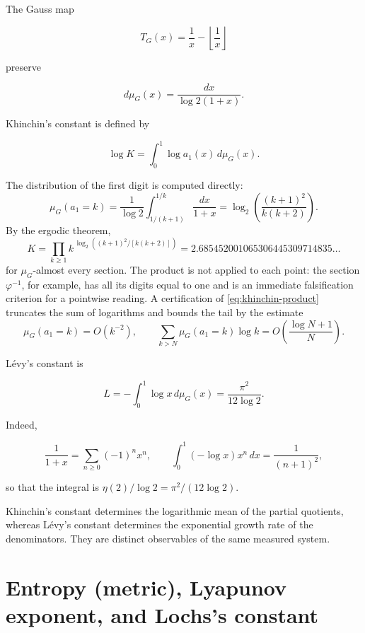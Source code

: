 The Gauss map \cite{Khinchin,IosifescuKraaikamp}

\[
T_G(x)=\frac1x-\left\lfloor\frac1x\right\rfloor
\]

preserve

\begin{equation}
d\mu_G(x)=\frac{dx}{\log2(1+x)}.
\label{eq:gauss-measure}
\end{equation}

Khinchin's constant is defined by

\begin{equation}
\log K=\int_0^1\log a_1(x)\,d\mu_G(x).
\label{eq:khinchin}
\end{equation}

The distribution of the first digit is computed directly:
\begin{equation}
\mu_G(a_1=k)
=\frac1{\log2}\int_{1/(k+1)}^{1/k}\frac{dx}{1+x}
=\log_2\!\left(\frac{(k+1)^2}{k(k+2)}\right).
\label{eq:gauss-digit-law}
\end{equation}
By the ergodic theorem,
\begin{equation}
K=\prod_{k\ge1}
k^{\,\log_2((k+1)^2/[k(k+2)])}
=2.685452001065306445309714835\ldots
\label{eq:khinchin-product}
\end{equation}
for \(\mu_G\)-almost every section. The product is not applied to each point:
the section \(\varphi^{-1}\), for example, has all its digits equal
to one and is an immediate falsification criterion for a pointwise reading. A
certification of \cref{eq:khinchin-product} truncates the sum of logarithms and
bounds the tail by the estimate
\[
\mu_G(a_1=k)=O(k^{-2}),
\qquad
\sum_{k>N}\mu_G(a_1=k)\log k
=O\!\left(\frac{\log N+1}{N}\right).
\]

Lévy's constant is

\begin{equation}
L=-\int_0^1\log x\,d\mu_G(x)
=\frac{\pi^2}{12\log2}.
\label{eq:levy}
\end{equation}

Indeed,

\[
\frac1{1+x}=\sum_{n\ge0}(-1)^nx^n,\qquad
\int_0^1(-\log x)x^n\,dx=\frac1{(n+1)^2},
\]

so that the integral is \(\eta(2)/\log2=\pi^2/(12\log2)\).

Khinchin's constant determines the logarithmic mean of the
partial quotients, whereas Lévy's constant determines the
exponential growth rate of the denominators. They are distinct observables
of the same measured system.

\section{Entropy (metric), Lyapunov exponent, and Lochs's constant}

